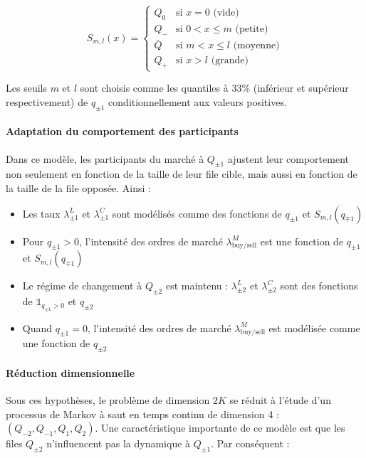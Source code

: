 \documentclass[12pt,a4paper]{article}
\theoremstyle{definition}
\theoremstyle{remark}
\begin{document}
    \begin{equation*}
    S_{m,l}(x) = \begin{cases}
    Q_0 & \text{si } x = 0 \text{ (vide)}\\
    Q_- & \text{si } 0 < x \leq m \text{ (petite)}\\
    \bar{Q} & \text{si } m < x \leq l \text{ (moyenne)}\\
    Q_+ & \text{si } x > l \text{ (grande)}
    \end{cases}
    \end{equation*}

    Les seuils $m$ et $l$ sont choisis comme les quantiles à 33\% (inférieur et supérieur respectivement) de $q_{\pm1}$ conditionnellement aux valeurs positives.

    \paragraph{Adaptation du comportement des participants}
    Dans ce modèle, les participants du marché à $Q_{\pm1}$ ajustent leur comportement non seulement en fonction de la taille de leur file cible, mais aussi en fonction de la taille de la file opposée. Ainsi :

    \begin{itemize}
        \item Les taux $\lambda^L_{\pm1}$ et $\lambda^C_{\pm1}$ sont modélisés comme des fonctions de $q_{\pm1}$ et $S_{m,l}(q_{\mp1})$
        \item Pour $q_{\pm1} > 0$, l'intensité des ordres de marché $\lambda^M_{\text{buy/sell}}$ est une fonction de $q_{\pm1}$ et $S_{m,l}(q_{\mp1})$
        \item Le régime de changement à $Q_{\pm2}$ est maintenu : $\lambda^L_{\pm2}$ et $\lambda^C_{\pm2}$ sont des fonctions de $\mathbb{1}_{q_{\pm1}>0}$ et $q_{\pm2}$
        \item Quand $q_{\pm1} = 0$, l'intensité des ordres de marché $\lambda^M_{\text{buy/sell}}$ est modélisée comme une fonction de $q_{\pm2}$
    \end{itemize}

    \paragraph{Réduction dimensionnelle}
    Sous ces hypothèses, le problème de dimension $2K$ se réduit à l'étude d'un processus de Markov à saut en temps continu de dimension 4 : $(Q_{-2}, Q_{-1}, Q_1, Q_2)$. Une caractéristique importante de ce modèle est que les files $Q_{\pm2}$ n'influencent pas la dynamique à $Q_{\pm1}$. Par conséquent :
\end{document}
